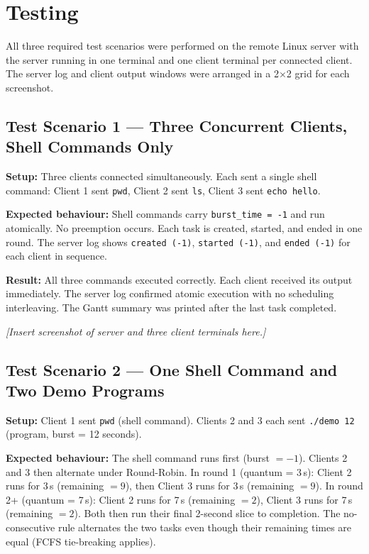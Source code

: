 \documentclass[12pt]{article}
\begin{document}
\section{Testing}

All three required test scenarios were performed on the remote Linux server with the server
running in one terminal and one client terminal per connected client. The server log and
client output windows were arranged in a 2$\times$2 grid for each screenshot.

\subsection{Test Scenario 1 --- Three Concurrent Clients, Shell Commands Only}

\textbf{Setup:} Three clients connected simultaneously. Each sent a single shell command:
Client 1 sent \texttt{pwd}, Client 2 sent \texttt{ls}, Client 3 sent \texttt{echo hello}.

\textbf{Expected behaviour:} Shell commands carry \texttt{burst\_time = -1} and run
atomically. No preemption occurs. Each task is created, started, and ended in one round.
The server log shows \texttt{created (-1)}, \texttt{started (-1)}, and \texttt{ended (-1)}
for each client in sequence.

\textbf{Result:} All three commands executed correctly. Each client received its output
immediately. The server log confirmed atomic execution with no scheduling interleaving.
The Gantt summary was printed after the last task completed.

\textit{[Insert screenshot of server and three client terminals here.]}

\subsection{Test Scenario 2 --- One Shell Command and Two Demo Programs}

\textbf{Setup:} Client 1 sent \texttt{pwd} (shell command). Clients 2 and 3 each sent
\texttt{./demo 12} (program, burst = 12 seconds).

\textbf{Expected behaviour:} The shell command runs first (burst $= -1$). Clients 2 and
3 then alternate under Round-Robin. In round 1 (quantum = 3\,s): Client 2 runs for 3\,s
(remaining $= 9$), then Client 3 runs for 3\,s (remaining $= 9$). In round 2+
(quantum = 7\,s): Client 2 runs for 7\,s (remaining $= 2$), Client 3 runs for 7\,s
(remaining $= 2$). Both then run their final 2-second slice to completion. The
no-consecutive rule alternates the two tasks even though their remaining times are equal
(FCFS tie-breaking applies).
\end{document}
